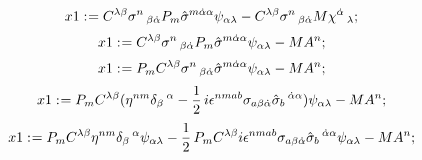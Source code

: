 \documentclass[11pt]{article}
\def\specialcolon{\mathrel{\mathop{:}}\hspace{-.5em}}
\begin{document}
\begin{dmath*}[compact, spread=2pt]
x1\specialcolon{}= {C}^{\lambda \beta} {\sigma}^{n}\,_{\beta \dot{\alpha}} {P}_{m} {\hat{\sigma}}^{m \dot{\alpha} \alpha} {\psi}_{\alpha \lambda} - {C}^{\lambda \beta} {\sigma}^{n}\,_{\beta \dot{\alpha}} M {\chi}^{\dot{\alpha}}\,_{\lambda};
\end{dmath*}
\begin{dmath*}[compact, spread=2pt]
x1\specialcolon{}= {C}^{\lambda \beta} {\sigma}^{n}\,_{\beta \dot{\alpha}} {P}_{m} {\hat{\sigma}}^{m \dot{\alpha} \alpha} {\psi}_{\alpha \lambda} - M {A}^{n};
\end{dmath*}
\begin{dmath*}[compact, spread=2pt]
x1\specialcolon{}= {P}_{m} {C}^{\lambda \beta} {\sigma}^{n}\,_{\beta \dot{\alpha}} {\hat{\sigma}}^{m \dot{\alpha} \alpha} {\psi}_{\alpha \lambda} - M {A}^{n};
\end{dmath*}
\begin{dmath*}[compact, spread=2pt]
x1\specialcolon{}= {P}_{m} {C}^{\lambda \beta} ({\eta}^{n m} {\delta}_{\beta}\,^{\alpha} - \frac{1}{2}\, i {\epsilon}^{n m a b} {\sigma}_{a \beta \dot{\alpha}} {\hat{\sigma}}_{b}\,^{\dot{\alpha} \alpha}) {\psi}_{\alpha \lambda} - M {A}^{n};
\end{dmath*}
\begin{dmath*}[compact, spread=2pt]
x1\specialcolon{}= {P}_{m} {C}^{\lambda \beta} {\eta}^{n m} {\delta}_{\beta}\,^{\alpha} {\psi}_{\alpha \lambda} - \frac{1}{2}\, {P}_{m} {C}^{\lambda \beta} i {\epsilon}^{n m a b} {\sigma}_{a \beta \dot{\alpha}} {\hat{\sigma}}_{b}\,^{\dot{\alpha} \alpha} {\psi}_{\alpha \lambda} - M {A}^{n};
\end{dmath*}
\end{document}
